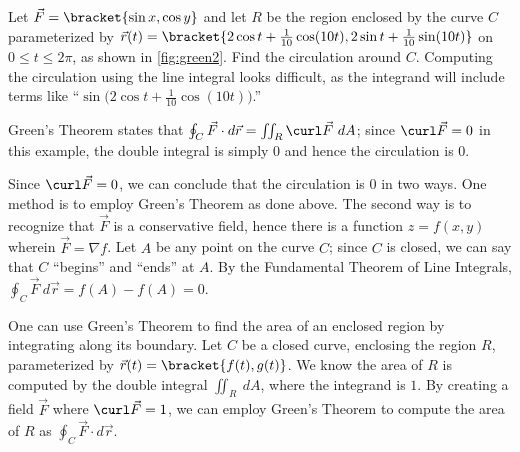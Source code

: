 
\begin{example}\label{ex_green2}
Let $\vec F =\bracket{\sin x,\cos y}$ and let $R$ be the region enclosed by the curve $C$ parameterized by $\vec r(t) =\bracket{2\cos t+ \frac1{10}\cos(10t),2\sin t+\frac1{10}\sin(10t)}$ on $0\leq t\leq 2\pi$, as shown in \autoref{fig:green2}. Find the circulation around $C$.
\solution
Computing the circulation using the line integral looks difficult, as the integrand will include terms like ``$\sin\bigl(2\cos t + \frac1{10}\cos(10t)\bigr)$.'' 

Green's Theorem states that $\oint_C\vec F\cdot d\vec r = \iint_R \curl\vec F\ dA$; since $\curl \vec F = 0$ in this example, the double integral is simply 0 and hence the circulation is 0.

Since $\curl \vec F = 0$, we can conclude that the circulation is 0 in two ways. One method is to employ Green's Theorem as done above. The second way is to recognize that $\vec F$ is a conservative field, hence there is a function $z=f(x,y)$ wherein $\vec F = \nabla f$. Let $A$ be any point on the curve $C$; since $C$ is closed, we can say that $C$ ``begins'' and ``ends'' at $A$. By the Fundamental Theorem of Line Integrals, $\oint_C \vec F\ d\vec r = f(A)-f(A) = 0$.
\end{example}

One can use Green's Theorem to find the area of an enclosed region by integrating along its boundary. Let $C$ be a closed curve, enclosing the region $R$, parameterized by $\vec r(t) =\bracket{f(t),g(t)}$. We know the area of $R$ is computed by the double integral $\iint_R \ dA$, where the integrand is $1$. By creating a field $\vec F$ where $\curl \vec F =1$, we can employ Green's Theorem to compute the area of $R$ as $\oint_C \vec F\cdot d\vec r$. 


